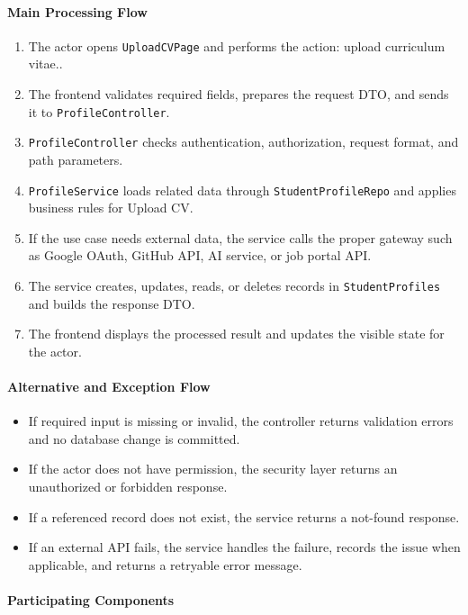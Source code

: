 \paragraph{Main Processing Flow}

\begin{enumerate}
    \item The actor opens \texttt{UploadCVPage} and performs the action: upload curriculum vitae..
    \item The frontend validates required fields, prepares the request DTO, and sends it to \texttt{ProfileController}.
    \item \texttt{ProfileController} checks authentication, authorization, request format, and path parameters.
    \item \texttt{ProfileService} loads related data through \texttt{StudentProfileRepo} and applies business rules for Upload CV.
    \item If the use case needs external data, the service calls the proper gateway such as Google OAuth, GitHub API, AI service, or job portal API.
    \item The service creates, updates, reads, or deletes records in \texttt{StudentProfiles} and builds the response DTO.
    \item The frontend displays the processed result and updates the visible state for the actor.
\end{enumerate}

\paragraph{Alternative and Exception Flow}

\begin{itemize}
    \item If required input is missing or invalid, the controller returns validation errors and no database change is committed.
    \item If the actor does not have permission, the security layer returns an unauthorized or forbidden response.
    \item If a referenced record does not exist, the service returns a not-found response.
    \item If an external API fails, the service handles the failure, records the issue when applicable, and returns a retryable error message.
\end{itemize}

\paragraph{Participating Components}

